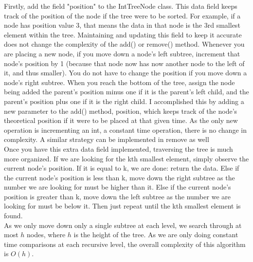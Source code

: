 \documentclass[12pt,a4paper]{article}
\begin{document}
Firstly, add the field "position" to the IntTreeNode class. This data field keeps track of the position of the node if the tree were to be sorted. For example, if a node has position value 3, that means the data in that node is the 3rd smallest element within the tree. Maintaining and updating this field to keep it accurate does not change the complexity of the add() or remove() method. Whenever you are placing a new node, if you move down a node's left subtree, increment that node's position by 1 (because that node now has now another node to the left of it, and thus smaller). You do not have to change the position if you move down a node's right subtree. When you reach the bottom of the tree, assign the node being added the parent's position minus one if it is the parent's left child, and the parent's position plus one if it is the right child. I accomplished this by adding a new parameter to the add() method, position, which keeps track of the node's theoretical position if it were to be placed at that given time. As the only new operation is incrementing an int, a constant time operation, there is no change in complexity. A similar strategy can be implemented in remove as well\\

Once you have this extra data field implemented, traversing the tree is much more organized. If we are looking for the kth smallest element, simply observe the current node's position. If it is equal to k, we are done: return the data. Else if the current node's position is less than k, move down the right subtree as the number we are looking for must be higher than it. Else if the current node's position is greater than k, move down the left subtree as the number we are looking for must be below it. Then just repeat until the kth smallest element is found.\\

As we only move down only a single subtree at each level, we search through at most $h$ nodes, where $h$ is the height of the tree. As we are only doing constant time comparisons at each recursive level, the overall complexity of this algorithm is $O(h)$.\\
\end{document}
